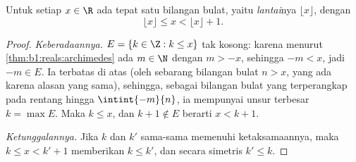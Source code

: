 \begin{theorem}\label{thm:b1:reals:floor}
Untuk setiap $x \in \R$ ada tepat satu bilangan bulat, yaitu
\emph{lantai}nya $\lfloor x \rfloor$, dengan
\[
\lfloor x \rfloor \leq x < \lfloor x \rfloor + 1 .
\]
\end{theorem}

\begin{proof}
\emph{Keberadaannya.}  $E = \{k \in \Z : k \leq x\}$ tak kosong:
karena menurut \cref{thm:b1:reals:archimedes} ada $m \in \N$ dengan $m > -x$,
sehingga $-m < x$, jadi $-m \in E$. Ia terbatas di atas (oleh sebarang bilangan bulat
$n > x$, yang ada karena alasan yang sama), sehingga, sebagai  bilangan
bulat yang terperangkap pada rentang hingga $\intint{-m}{n}$, ia mempunyai
unsur terbesar $k = \max E$. Maka $k \leq x$, dan $k + 1 \notin E$
berarti $x < k + 1$.

\emph{Ketunggalannya.} Jika $k$ dan $k'$ sama-sama memenuhi ketaksamaannya,
maka $k \leq x < k' + 1$ memberikan $k \leq k'$, dan secara simetris $k'
\leq k$.
\end{proof}

